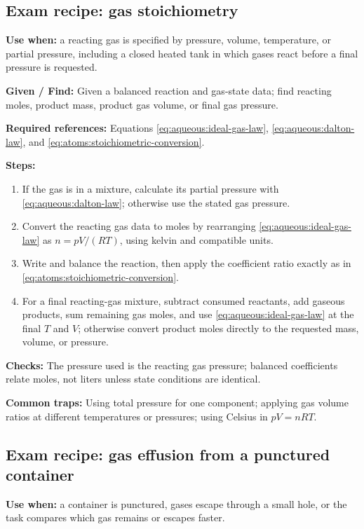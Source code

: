 \subsection{Exam recipe: gas stoichiometry}
\textbf{Use when:} a reacting gas is specified by pressure, volume, temperature, or partial pressure, including a closed heated tank in which gases react before a final pressure is requested.

\textbf{Given / Find:} Given a balanced reaction and gas-state data; find reacting moles, product mass, product gas volume, or final gas pressure.

\textbf{Required references:} Equations \eqref{eq:aqueous:ideal-gas-law}, \eqref{eq:aqueous:dalton-law}, and \eqref{eq:atoms:stoichiometric-conversion}.


\textbf{Steps:}
\begin{enumerate}
    \item If the gas is in a mixture, calculate its partial pressure with \eqref{eq:aqueous:dalton-law}; otherwise use the stated gas pressure.
    \item Convert the reacting gas data to moles by rearranging \eqref{eq:aqueous:ideal-gas-law} as \(n=pV/(RT)\), using kelvin and compatible units.
    \item Write and balance the reaction, then apply the coefficient ratio exactly as in \eqref{eq:atoms:stoichiometric-conversion}.
    \item For a final reacting-gas mixture, subtract consumed reactants, add gaseous products, sum remaining gas moles, and use \eqref{eq:aqueous:ideal-gas-law} at the final \(T\) and \(V\); otherwise convert product moles directly to the requested mass, volume, or pressure.
\end{enumerate}

\textbf{Checks:} The pressure used is the reacting gas pressure; balanced coefficients relate moles, not liters unless state conditions are identical.

\textbf{Common traps:} Using total pressure for one component; applying gas volume ratios at different temperatures or pressures; using Celsius in \(pV=nRT\).

\subsection{Exam recipe: gas effusion from a punctured container}
\textbf{Use when:} a container is punctured, gases escape through a small hole, or the task compares which gas remains or escapes faster.

